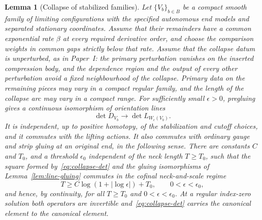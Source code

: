\documentclass[11pt]{amsart}
\newtheorem{lemma}[theorem]{Lemma}
\theoremstyle{definition}
\theoremstyle{remark}
\theoremstyle{plain}
\numberwithin{equation}{section}
\begin{document}
\begin{lemma}[Collapse of stabilized families]\label{lem:collapse-family}
Let $\{V_b\}_{b\in B}$ be a compact smooth family of limiting
configurations with the specified autonomous end models and
separated stationary coordinates. Assume that their remainders
have a common exponential rate $\beta$ at every required derivative
order, and choose the comparison weights in common gaps strictly
below that rate. Assume that the collapse datum is unperturbed, as
in Paper~I: the primary perturbation vanishes on the inserted
compression body, and the dependence region and the output of every
other perturbation avoid a fixed neighbourhood of the collapse.
Primary data on the remaining pieces may vary in a compact
regular family, and the length of the collapse arc may vary in a compact
range. For sufficiently small
$\epsilon>0$, pregluing gives a continuous isomorphism of
orientation lines
\begin{equation}\label{eq:collapse-det}
 \det D_{V_b}\longrightarrow\det L_{W_\epsilon(V_b)}.
\end{equation}
It is independent, up to positive homotopy, of the stabilization
and cutoff choices, and it commutes with the lifting actions. It also
commutes with ordinary gauge and strip gluing at an original end, in
the following sense. There are constants $C$ and $T_0$, and a threshold
$\epsilon_0$ independent of the neck length $T\ge T_0$, such that the
square formed by~\eqref{eq:collapse-det} and the gluing isomorphisms of
Lemma~\ref{lem:line-gluing} commutes in the \emph{cofinal neck-and-scale
regime}
\[
 T\ge C\log(1+|\log\epsilon|)+T_0,\qquad 0<\epsilon<\epsilon_0 ,
\]
and hence, by continuity, for all $T\ge T_0$ and
$0<\epsilon<\epsilon_0$. At a regular index-zero solution both
operators are invertible and~\eqref{eq:collapse-det} carries the
canonical element to the canonical element.
\end{lemma}
\end{document}
